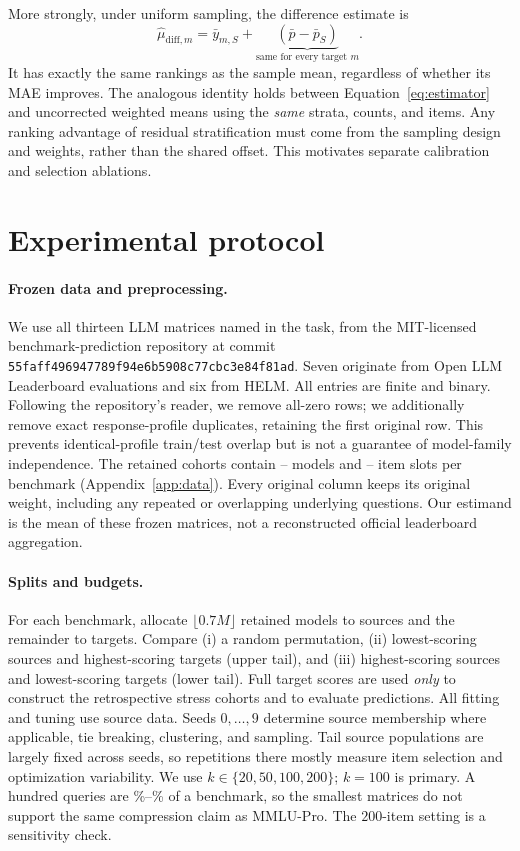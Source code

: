 \documentclass{article}
\begin{document}
More strongly, under uniform sampling, the difference estimate is
\begin{equation}
\widehat\mu_{\mathrm{diff},m}=\bar y_{m,S}+
\underbrace{(\bar p-\bar p_S)}_{\text{same for every target }m}.
\label{eq:rank_identity}
\end{equation}
It has exactly the same rankings as the sample mean, regardless of whether its MAE improves. The analogous identity holds between Equation~\eqref{eq:estimator} and uncorrected weighted means using the \emph{same} strata, counts, and items. Any ranking advantage of residual stratification must come from the sampling design and weights, rather than the shared offset. This motivates separate calibration and selection ablations.

\section{Experimental protocol}
\label{sec:experiments}
\paragraph{Frozen data and preprocessing.}
We use all thirteen LLM matrices named in the task, from the MIT-licensed benchmark-prediction repository at commit \texttt{55faff496947789f94e6b5908c77cbc3e84f81ad}. Seven originate from Open LLM Leaderboard evaluations and six from HELM. All entries are finite and binary. Following the repository's reader, we remove \RemovedZeroRows{} all-zero rows; we additionally remove \RemovedDuplicateRows{} exact response-profile duplicates, retaining the first original row. This prevents identical-profile train/test overlap but is not a guarantee of model-family independence. The retained cohorts contain \ModelMin{}--\ModelMax{} models and \ItemMin{}--\ItemMax{} item slots per benchmark (Appendix~\ref{app:data}). Every original column keeps its original weight, including any repeated or overlapping underlying questions. Our estimand is the mean of these frozen matrices, not a reconstructed official leaderboard aggregation.

\paragraph{Splits and budgets.}
For each benchmark, allocate $\lfloor0.7M\rfloor$ retained models to sources and the remainder to targets. Compare (i) a random permutation, (ii) lowest-scoring sources and highest-scoring targets (upper tail), and (iii) highest-scoring sources and lowest-scoring targets (lower tail). Full target scores are used \emph{only} to construct the retrospective stress cohorts and to evaluate predictions. All fitting and tuning use source data. Seeds $0,\ldots,9$ determine source membership where applicable, tie breaking, clustering, and sampling. Tail source populations are largely fixed across seeds, so repetitions there mostly measure item selection and optimization variability. We use $k\in\{20,50,100,200\}$; $k=100$ is primary. A hundred queries are \BudgetFractionMin{}\%--\BudgetFractionMax{}\% of a benchmark, so the smallest matrices do not support the same compression claim as MMLU-Pro. The $200$-item setting is a sensitivity check.
\end{document}
